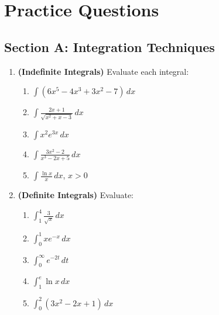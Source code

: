 \documentclass[12pt, a4paper]{article}
\theoremstyle{definition}
\newcommand{\dd}[1]{\,d#1}
\begin{document}
\section{Practice Questions}

\subsection{Section A: Integration Techniques}

\begin{enumerate}[label=\textbf{A\arabic*.},leftmargin=2.5em]

\item \textbf{(Indefinite Integrals)} Evaluate each integral:
\begin{enumerate}[label=(\alph*)]
  \item $\displaystyle\int(6x^5 - 4x^3 + 3x^2 - 7)\dd{x}$
  \item $\displaystyle\int\frac{2x+1}{\sqrt{x^2+x-3}}\dd{x}$
  \item $\displaystyle\int x^2 e^{3x}\dd{x}$
  \item $\displaystyle\int\frac{3x^2-2}{x^3-2x+5}\dd{x}$
  \item $\displaystyle\int\frac{\ln x}{x}\dd{x}$, \quad $x>0$
\end{enumerate}

\item \textbf{(Definite Integrals)} Evaluate:
\begin{enumerate}[label=(\alph*)]
  \item $\displaystyle\int_1^4\frac{3}{\sqrt{x}}\dd{x}$
  \item $\displaystyle\int_0^1 xe^{-x}\dd{x}$
  \item $\displaystyle\int_0^\infty e^{-2t}\dd{t}$
  \item $\displaystyle\int_1^e\ln x\dd{x}$
  \item $\displaystyle\int_0^2(3x^2-2x+1)\dd{x}$
\end{enumerate}


\end{enumerate}
\end{document}
